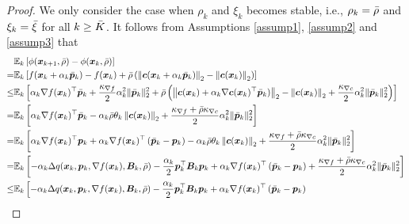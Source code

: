 \documentclass[aos]{imsart}
\numberwithin{equation}{section}
\theoremstyle{plain}
\begin{document}
\begin{appendix}
\begin{proof}
    We only consider the case when $\rho_k$ and $\xi_k$ becomes stable, i.e., $\rho_k = \Bar{\rho}$ and $\xi_k = \Bar{\xi}$ for all $k \geq \Bar{K}$. It follows from Assumptions \ref{assump1}, \ref{assump2} and \ref{assump3} that
    \begin{equation}
    \label{eq23}
        \begin{split}
            & \mathbb{E}_k \left[ \phi(\bm{x}_{k+1},\Bar{\rho}) - \phi(\bm{x}_{k},\Bar{\rho}) \right]\\
            = & \mathbb{E}_k \left[ f(\bm{x}_k+\alpha_k \Bar{\bm{p}}_k) - f(\bm{x}_k) + \Bar{\rho}\left(\left\| \bm{c}(\bm{x}_k + \alpha_k \Bar{\bm{p}}_k)\right\|_2 - \left\|\bm{c}(\bm{x}_k) \right\|_2 \right) \right]\\
            \leq & \mathbb{E}_k \left[ \alpha_k \nabla f(\bm{x}_k)^{\top} \Bar{\bm{p}}_{k} + \frac{\kappa_{\nabla f}}{2} \alpha_k^2 \|\Bar{\bm{p}}_k\|_2^2 + \Bar{\rho} \left(\left\| \bm{c}(\bm{x}_k) + \alpha_k \nabla \bm{c}(\bm{x}_k)^{\top} \Bar{\bm{p}}_k)\right\|_2 - \left\|\bm{c}(\bm{x}_k) \right\|_2 + \frac{\kappa_{\nabla c}}{2} \alpha_k^2 \|\Bar{\bm{p}}_k\|_2^2 \right) \right]\\
            = & \mathbb{E}_k \left[ \alpha_k \nabla f(\bm{x}_k)^{\top} \Bar{\bm{p}}_{k} - \alpha_k \Bar{\rho} \theta_k \left\| \bm{c}(\bm{x}_k) \right\|_2 + \frac{\kappa_{\nabla f} + \Bar{\rho} \kappa_{\nabla c}}{2} \alpha_k^2 \|\Bar{\bm{p}}_k\|_2^2  \right]\\
            = & \mathbb{E}_k \left[ \alpha_k \nabla f(\bm{x}_k)^{\top} \bm{p}_{k} + \alpha_k \nabla f(\bm{x}_k)^{\top} \left(\Bar{\bm{p}}_k - \bm{p}_k \right) - \alpha_k \Bar{\rho} \theta_k \left\| \bm{c}(\bm{x}_k) \right\|_2 + \frac{\kappa_{\nabla f} + \Bar{\rho} \kappa_{\nabla c}}{2} \alpha_k^2 \|\Bar{\bm{p}}_k\|_2^2 \right]\\
            = & \mathbb{E}_k \left[-\alpha_k \Delta q(\bm{x}_k,\bm{p}_k,\nabla f(\bm{x}_k),\bm{B}_k,\Bar{\rho}) -\frac{\alpha_k}{2}\bm{p}_k^{\top} \bm{B}_k \bm{p}_k + \alpha_k \nabla f(\bm{x}_k)^{\top} \left(\Bar{\bm{p}}_k - \bm{p}_k \right) + \frac{\kappa_{\nabla f} + \Bar{\rho} \kappa_{\nabla c}}{2} \alpha_k^2 \|\Bar{\bm{p}}_k\|_2^2  \right]\\
            \leq & \mathbb{E}_k \left[ - \alpha_k \Delta q(\bm{x}_k,\bm{p}_k,\nabla f(\bm{x}_k),\bm{B}_k,\Bar{\rho})  -\frac{\alpha_k}{2}\bm{p}_k^{\top} \bm{B}_k \bm{p}_k + \alpha_k \nabla f(\bm{x}_k)^{\top} \left(\Bar{\bm{p}}_k - \bm{p}_k \right) \right. \\

\end{split}
\end{equation}
\end{proof}
\end{appendix}
\end{document}
